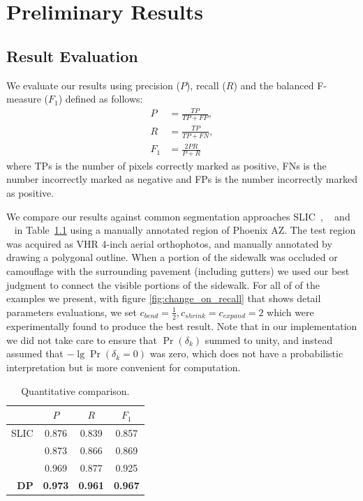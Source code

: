 \chapter{Preliminary Results}

\section{Result Evaluation}

We evaluate our results using precision ($P$), recall ($R$) and the balanced F-measure ($F_1$) defined as follows:
\begin{align}
     P &= \frac{\mathit{TP}}{\mathit{TP} + \mathit{FP}}, \\
     R &= \frac{\mathit{TP}}{\mathit{TP} + \mathit{FN}}, \\  
     F_1 &= \frac{2 P R}{P + R}
\end{align}
where 
\acp{TP} is the number of pixels correctly marked as positive, 
\acp{FN} is the number incorrectly marked as negative and 
\acp{FP} is the number incorrectly marked as positive. 

We compare our results against common segmentation approaches 
\ac{SLIC}~\cite{Achanta:149300}, \ActiveContours{}~\cite{ActiveContou09} and \GrabCut{}~\cite{Rother2004-ou} 
in Table~\ref{tab:quantitative-against-common} using a manually annotated region of 
Phoenix AZ. The test region was acquired as \ac{VHR} 4-inch aerial orthophotos, 
and manually annotated by drawing a polygonal outline. 
When a portion of the sidewalk was occluded or camouflage with the surrounding pavement 
(including gutters) we used our best judgment to connect the visible portions of the sidewalk. For all of of the examples we present, with figure \ref{fig:change_on_recall} that shows detail parameters evaluations, we set $c_\mathit{bend}=\frac{1}{2}, c_\mathit{shrink}=c_\mathit{expand}=2$ which were experimentally found to produce the best result. Note that in our implementation we did not take care to ensure that $\Pr(\delta_k)$ summed to unity, and instead assumed that $-\lg \Pr(\delta_k=0)$ was zero, which does not have a probabilistic interpretation but is more convenient for computation. 

\begin{table}[h!]
    \caption{Quantitative comparison. }
    \label{tab:quantitative-against-common}
    \centering
    \begin{tabular}{r ccc}
                            & $P$ & $R$& $F_1$ \\ 
                                 \hline 
                  \ac{SLIC} & 0.876 & 0.839 & 0.857 \\
          \ActiveContours{} & 0.873 & 0.866 & 0.869  \\
                 \GrabCut{} & 0.969 & 0.877 & 0.925  \\ 
                                 \hline
                \textbf{DP} & \textbf{0.973} & \textbf{0.961} & \textbf{0.967}   
    \end{tabular}
\end{table}

